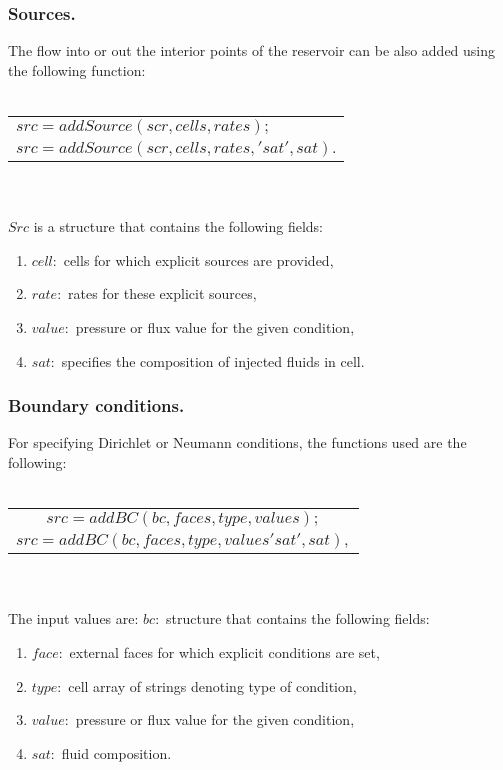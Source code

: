 \documentclass[a4paper,10pt]{report}
\begin{document}
\subsubsection{Sources.}
The flow into or out the interior points of the reservoir can be also added using the following function:\\\\
\begin{tabular}{|l|}
\hline
 $src=addSource(scr,cells,rates);$\\
 $src=addSource(scr,cells,rates,'sat',sat).$\\
\hline
\end{tabular}
\\\\$Src$ is a structure that contains the following fields:
\begin{enumerate}
 \item $cell:$ cells for which explicit sources are provided,
 \item $rate:$ rates for these explicit sources,
 \item $value:$ pressure or flux value for the given condition,
 \item $sat:$ specifies the composition of injected fluids in cell. 
\end{enumerate}
\subsubsection{Boundary conditions.}
For specifying Dirichlet or Neumann conditions, the functions used are the following:\\\\
\begin{tabular}{|l|}
\hline
 $$src=addBC(bc,faces,type,values);$$\\
 $$src=addBC(bc,faces,type,values'sat',sat),$$\\
\hline 
\end{tabular}
\\\\The input values are:
$bc:$ structure that contains the following fields:
\begin{enumerate}
 \item $face:$ external faces for which explicit conditions are set,
 \item $type:$ cell array of strings denoting type of condition,
 \item $value:$ pressure or flux value for the given condition,
 \item $sat:$ fluid composition.
\end{enumerate}
\end{document}
